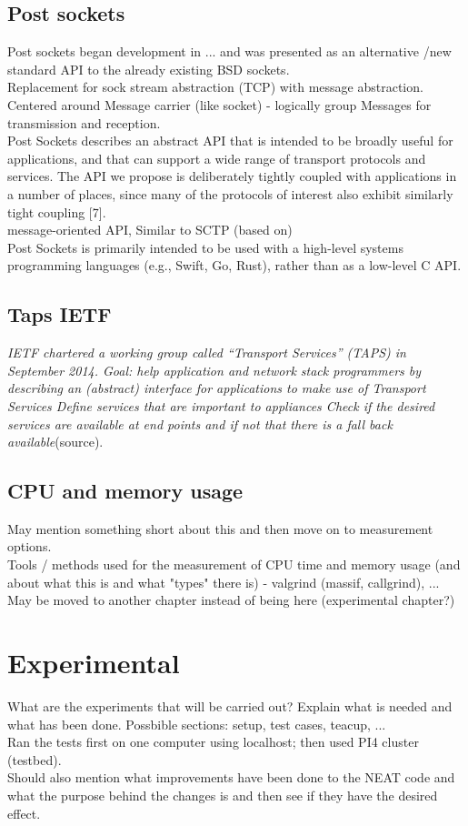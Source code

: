 \documentclass[12pt]{report}
\begin{document}
\section{Post sockets}
Post sockets began development in ... and was presented as an alternative /new standard  API to the already existing BSD sockets. \\
Replacement for sock stream abstraction (TCP) with message abstraction. \\
Centered around Message carrier (like socket) - logically group Messages for transmission and reception.\\
Post Sockets describes an abstract API that is intended to be broadly useful for applications, and that can support a wide range of transport protocols and services. The API we propose
is deliberately tightly coupled with applications in a number of places, since many of the protocols of interest also exhibit similarly tight coupling [7].\\
message-oriented API,
Similar to SCTP (based on) \\
Post Sockets is primarily intended to be used with a high-level systems programming languages (e.g., Swift, Go, Rust), rather than as a low-level C API.

\section{Taps IETF}
\textit{IETF chartered a working group called “Transport Services” (TAPS) in September 2014.
Goal:  help application and network stack programmers by describing an (abstract) interface for applications to make use of Transport Services
Define services that are important to appliances
Check if the desired services are available at end points and if not that there is a fall back available}(source).


\section{CPU and memory usage}
May mention something short about this and then move on to measurement options. \\
Tools / methods used for the measurement of CPU time and memory usage (and about what this is and what "types" there is) - valgrind (massif, callgrind), ... \\
May be moved to another chapter instead of being here (experimental chapter?)

\chapter{Experimental}
What are the experiments that will be carried out? Explain what is needed and what has been done. Possbible sections: setup, test cases, teacup, ... \\
Ran the tests first on one computer using localhost; then used PI4 cluster (testbed).
\\
Should also mention what improvements have been done to the NEAT code and what the purpose behind the changes is and then see if they have the desired effect.
\end{document}

